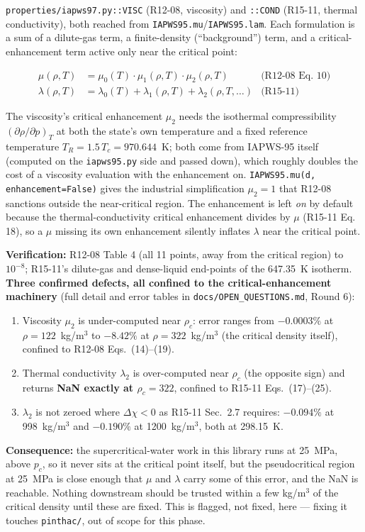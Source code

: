 \documentclass[11pt]{article}
\newcommand{\code}[1]{\texttt{#1}}
\begin{document}
\code{properties/iapws97.py::VISC} (R12-08, viscosity) and \code{::COND} (R15-11,
thermal conductivity), both reached from \code{IAPWS95.mu}/\code{IAPWS95.lam}. Each
formulation is a sum of a dilute-gas term, a finite-density (``background'') term, and
a critical-enhancement term active only near the critical point:

\begin{align*}
  \mu(\rho,T) &= \mu_0(T)\cdot\mu_1(\rho,T)\cdot\mu_2(\rho,T) &\text{(R12-08 Eq. 10)}\\
  \lambda(\rho,T) &= \lambda_0(T) + \lambda_1(\rho,T) + \lambda_2(\rho,T,\ldots) &\text{(R15-11)}
\end{align*}

The viscosity's critical enhancement $\mu_2$ needs the isothermal compressibility
$(\partial\rho/\partial p)_T$ at both the state's own temperature and a fixed reference
temperature $T_R=1.5\,T_c=970.644$~K; both come from IAPWS-95 itself (computed on the
\code{iapws95.py} side and passed down), which roughly doubles the cost of a viscosity
evaluation with the enhancement on. \code{IAPWS95.mu(d, enhancement=False)} gives the
industrial simplification $\mu_2=1$ that R12-08 sanctions outside the near-critical
region. The enhancement is left \emph{on} by default because the thermal-conductivity
critical enhancement divides by $\mu$ (R15-11 Eq. 18), so a $\mu$ missing its own
enhancement silently inflates $\lambda$ near the critical point.

\textbf{Verification:} R12-08 Table 4 (all 11 points, away from the critical region) to
$10^{-8}$; R15-11's dilute-gas and dense-liquid end-points of the 647.35~K isotherm.
\textbf{Three confirmed defects, all confined to the critical-enhancement machinery}
(full detail and error tables in \code{docs/OPEN\_QUESTIONS.md}, Round 6):
\begin{enumerate}
  \item Viscosity $\mu_2$ is under-computed near $\rho_c$: error ranges from
    $-0.0003\%$ at $\rho=122$~kg/m$^3$ to $-8.42\%$ at $\rho=322$~kg/m$^3$ (the critical
    density itself), confined to R12-08 Eqs.\ (14)--(19).
  \item Thermal conductivity $\lambda_2$ is over-computed near $\rho_c$ (the opposite
    sign) and returns \textbf{NaN exactly at $\rho_c=322$}, confined to R15-11
    Eqs.\ (17)--(25).
  \item $\lambda_2$ is not zeroed where $\Delta\chi<0$ as R15-11 Sec.\ 2.7 requires:
    $-0.094\%$ at 998~kg/m$^3$ and $-0.190\%$ at 1200~kg/m$^3$, both at 298.15~K.
\end{enumerate}
\textbf{Consequence:} the supercritical-water work in this library runs at 25~MPa,
above $p_c$, so it never sits at the critical point itself, but the pseudocritical
region at 25~MPa is close enough that $\mu$ and $\lambda$ carry some of this error, and
the NaN is reachable. Nothing downstream should be trusted within a few kg/m$^3$ of the
critical density until these are fixed. This is flagged, not fixed, here --- fixing it
touches \code{pinthac/}, out of scope for this phase.
\end{document}

